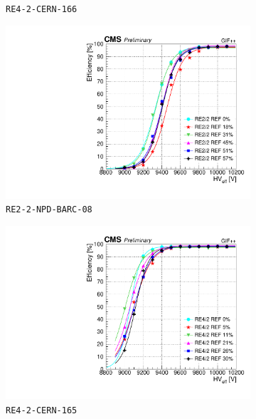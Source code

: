 \begin{figure}[H]
\begin{subfigure}{0.5\linewidth}
        	\caption{\label{fig:GIFpp_eff_vs_HV_OFF:B} \texttt{RE4-2-CERN-166}}
    	\end{subfigure}
    	\begin{subfigure}{0.5\linewidth}
			\centering
    		\includegraphics[width = \linewidth]{fig/chapt5/OFF-efficiency_vs_HV_RE2_2-REF.pdf}
        	\caption{\label{fig:GIFpp_eff_vs_HV_OFF:C} \texttt{RE2-2-NPD-BARC-08}}
    	\end{subfigure}
    	\begin{subfigure}{0.5\linewidth}
			\centering
    		\includegraphics[width = \linewidth]{fig/chapt5/OFF-efficiency_vs_HV_RE4_2-REF.pdf}
        	\caption{\label{fig:GIFpp_eff_vs_HV_OFF:D} \texttt{RE4-2-CERN-165}}
    	\end{subfigure}
		\caption{\label{fig:GIFpp_eff_vs_HV_OFF} }
	\end{figure}
	
